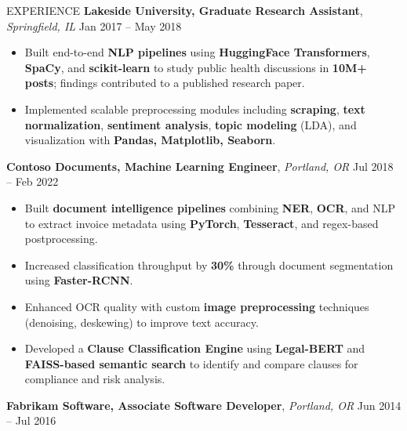 \documentclass{resume} %
\begin{document}
\begin{rSection}{EXPERIENCE}
\vspace{-0.4em}
\textbf{Lakeside University, Graduate Research Assistant}, \textit{Springfield, IL} \hfill Jan 2017 – May 2018
\vspace{-0.5em}  %

\begin{itemize}
\itemsep -3pt {}
    \item Built end-to-end \textbf{NLP pipelines} using \textbf{HuggingFace Transformers}, \textbf{SpaCy}, and \textbf{scikit-learn} to study public health discussions in \textbf{10M+ posts}; findings contributed to a published research paper.
    \item Implemented scalable preprocessing modules including \textbf{scraping}, \textbf{text normalization}, \textbf{sentiment analysis}, \textbf{topic modeling} (LDA), and visualization with \textbf{Pandas, Matplotlib, Seaborn}.
\end{itemize}


\vspace{-0.4em}
\textbf{Contoso Documents, Machine Learning Engineer}, \textit{Portland, OR} \hfill Jul 2018 – Feb 2022
\vspace{-0.5em}  %

\begin{itemize}
\itemsep -3pt {}
    \item Built \textbf{document intelligence pipelines} combining \textbf{NER}, \textbf{OCR}, and NLP to extract invoice metadata using \textbf{PyTorch}, \textbf{Tesseract}, and regex-based postprocessing.
    \item Increased classification throughput by \textbf{30\%} through document segmentation using \textbf{Faster-RCNN}.
    \item Enhanced OCR quality with custom \textbf{image preprocessing} techniques (denoising, deskewing) to improve text accuracy.
     \item Developed a \textbf{Clause Classification Engine} using \textbf{Legal-BERT} and \textbf{FAISS-based semantic search} to identify and compare clauses for compliance and risk analysis.
\end{itemize}


\vspace{-0.4em}
\textbf{Fabrikam Software, Associate Software Developer}, \textit{Portland, OR} \hfill Jun 2014 – Jul 2016
\vspace{-0.5em}  %


\end{rSection}
\end{document}
